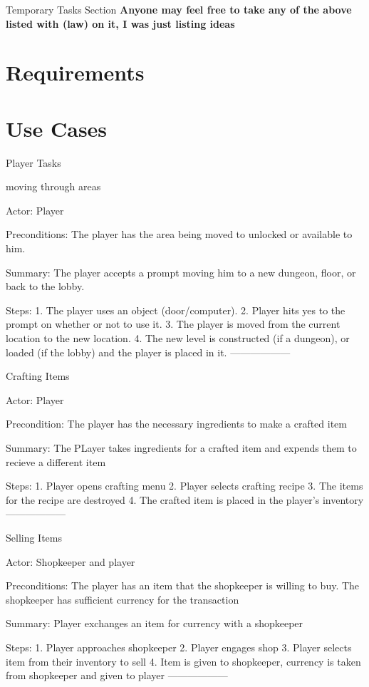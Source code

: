\documentclass[12pt]{report}
\begin{document}
\begin{section}{Temporary Tasks Section}
\large \textbf{Anyone may feel free to take any of the above listed with (law) on it, 
I was just listing ideas}

\end{section}

\chapter{Requirements}

\chapter{Use Cases}
\begin {section}{Player Tasks}

moving through areas %

Actor: Player

Preconditions: The player has the area being moved to unlocked or available to him.

Summary: The player accepts a prompt moving him to a new dungeon, floor, or back to the lobby.

Steps:
1. The player uses an object (door/computer).
2. Player hits yes to the prompt on whether or not to use it.
3. The player is moved from the current location to the new location.
4. The new level is constructed (if a dungeon), or loaded (if the lobby) and the player is placed in it.
------------------

Crafting Items %

Actor: Player

Precondition: The player has the necessary ingredients to make a crafted item

Summary: The PLayer takes ingredients for a crafted item and expends them to recieve a different item

Steps:
1. Player opens crafting menu
2. Player selects crafting recipe
3. The items for the recipe are destroyed
4. The crafted item is placed in the player's inventory
------------------

Selling Items %

Actor: Shopkeeper and player

Preconditions: The player has an item that the shopkeeper is willing to buy. The shopkeeper has sufficient
currency for the transaction

Summary: Player exchanges an item for currency with a shopkeeper

Steps: 
1. Player approaches shopkeeper
2. Player engages shop
3. Player selects item from their inventory to sell
4. Item is given to shopkeeper, currency is taken from shopkeeper and given to player
------------------


\end{section}
\end{document}
